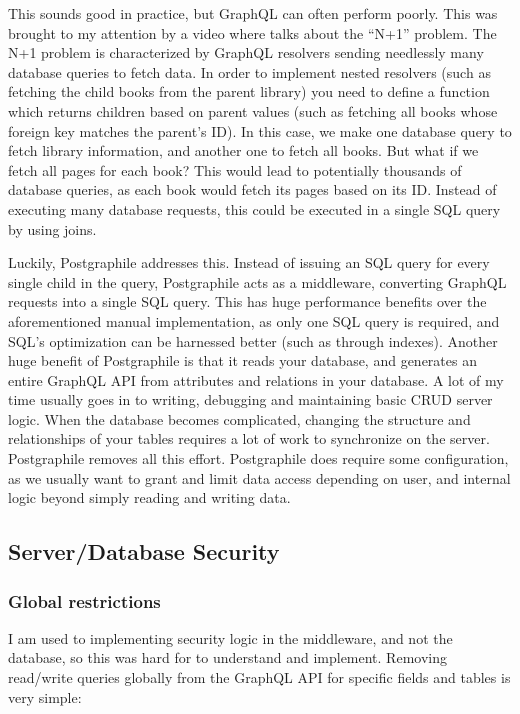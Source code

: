 \documentclass{l4proj}
\begin{document}
This sounds good in practice, but GraphQL can often perform poorly. This was brought to my attention by a video where \citet{Awad} talks about the ``N+1'' problem. The N+1 problem is characterized by GraphQL resolvers sending needlessly many database queries to fetch data. In order to implement nested resolvers (such as fetching the child books from the parent library) you need to define a function which returns children based on parent values (such as fetching all books whose foreign key matches the parent's ID). In this case, we make one database query to fetch library information, and another one to fetch all books. But what if we fetch all pages for each book? This would lead to potentially thousands of database queries, as each book would fetch its pages based on its ID. Instead of executing many database requests, this could be executed in a single SQL query by using joins.

Luckily, Postgraphile addresses this. Instead of issuing an SQL query for every single child in the query, Postgraphile acts as a middleware, converting GraphQL requests into a single SQL query. This has huge performance benefits over the aforementioned manual implementation, as only one SQL query is required, and SQL's optimization can be harnessed better (such as through indexes). Another huge benefit of Postgraphile is that it reads your database, and generates an entire GraphQL API from attributes and relations in your database. A lot of my time usually goes in to writing, debugging and maintaining basic CRUD server logic. When the database becomes complicated, changing the structure and relationships of your tables requires a lot of work to synchronize on the server. Postgraphile removes all this effort. Postgraphile does require some configuration, as we usually want to grant and limit data access depending on user, and internal logic beyond simply reading and writing data. 


\newpage
\subsection{Server/Database Security}

\subsubsection{Global restrictions}
I am used to implementing security logic in the middleware, and not the database, so this was hard for to understand and implement. 
Removing read/write queries globally from the GraphQL API for specific fields and tables is very simple:
\end{document}
